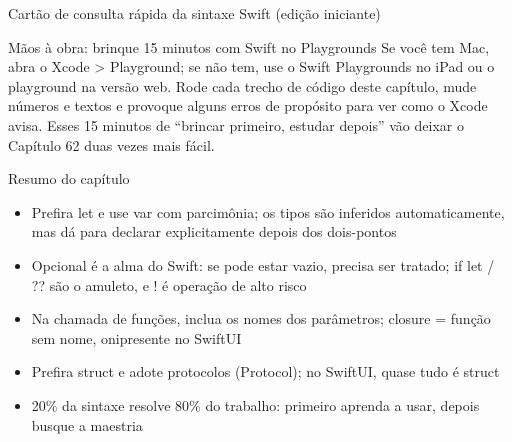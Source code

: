 \begin{center}\small\color{gray}Cartão de consulta rápida da sintaxe Swift (edição iniciante)\end{center}

\begin{tcbpractice}{Mãos à obra: brinque 15 minutos com Swift no Playgrounds}
Se você tem Mac, abra o Xcode > Playground; se não tem, use o Swift Playgrounds no iPad ou o playground na versão web. Rode cada trecho de código deste capítulo, mude números e textos e provoque alguns erros de propósito para ver como o Xcode avisa. Esses 15 minutos de “brincar primeiro, estudar depois” vão deixar o Capítulo 62 duas vezes mais fácil.

\end{tcbpractice}

\begin{tcbsummary}{Resumo do capítulo}
\begin{itemize}
  \item Prefira let e use var com parcimônia; os tipos são inferidos automaticamente, mas dá para declarar explicitamente depois dos dois-pontos
  \item Opcional é a alma do Swift: se pode estar vazio, precisa ser tratado; if let / ?? são o amuleto, e ! é operação de alto risco
  \item Na chamada de funções, inclua os nomes dos parâmetros; closure = função sem nome, onipresente no SwiftUI
  \item Prefira struct e adote protocolos (Protocol); no SwiftUI, quase tudo é struct
  \item 20\% da sintaxe resolve 80\% do trabalho: primeiro aprenda a usar, depois busque a maestria
\end{itemize}

\end{tcbsummary}
